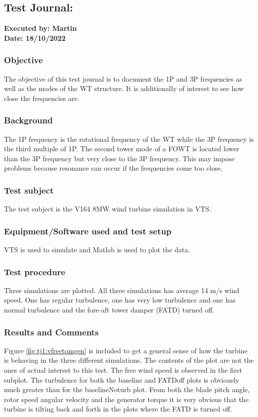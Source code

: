 \subsection{Test Journal: } \label{app:tj_01}

\textbf{Executed by: Martin} \\
\textbf{Date: 18/10/2022}

\subsubsection{Objective}
The objective of this test journal is to document the 1P and 3P frequencies as well as the modes of the WT structure. It is additionally of interest to see how close the frequencies are.

\subsubsection{Background}
The 1P frequency is the rotational frequency of the WT while the 3P frequency is the third multiple of 1P. The second tower mode of a FOWT is located lower than the 3P frequency but very close to the 3P frequency. This may impose problems because resonance can occur if the frequencies come too close.

\subsubsection{Test subject}
The test subject is the V164 8MW wind turbine simulation in VTS.

\subsubsection{Equipment/Software used and test setup}
VTS is used to simulate and Matlab is used to plot the data.

\subsubsection{Test procedure}
Three simulations are plotted. All three simulations has average 14 m/s wind speed. One has regular turbulence, one has very low turbulence and one has normal turbulence and the fore-aft tower damper (FATD) turned off.

\subsubsection{Results and Comments}
Figure \cref{fig:tj1:vfreetomgen} is included to get a general sense of how the turbine is behaving in the three different simulations. The contents of the plot are not the ones of actual interest to this test. The free wind speed is observed in the first subplot. The turbulence for both the baseline and FATDoff plots is obviously much greater than for the baselineNoturb plot. From both the blade pitch angle, rotor speed angular velocity and the generator torque it is very obvious that the turbine is tilting back and forth in the plots where the FATD is turned off.

